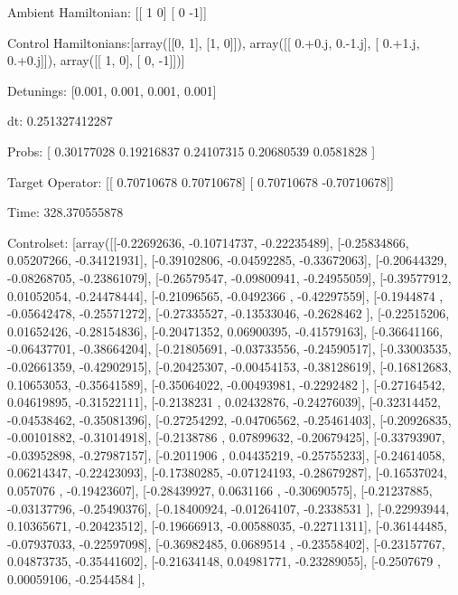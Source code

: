 \documentclass{article}
\begin{document}
    

\newpage

Ambient Hamiltonian: [[ 1  0]
 [ 0 -1]]

Control Hamiltonians:[array([[0, 1],
       [1, 0]]), array([[ 0.+0.j,  0.-1.j],
       [ 0.+1.j,  0.+0.j]]), array([[ 1,  0],
       [ 0, -1]])]

Detunings: [0.001, 0.001, 0.001, 0.001]

 dt: 0.251327412287

Probs: [ 0.30177028  0.19216837  0.24107315  0.20680539  0.0581828 ]

Target Operator: [[ 0.70710678  0.70710678]
 [ 0.70710678 -0.70710678]]

Time: 328.370555878

Controlset: [array([[-0.22692636, -0.10714737, -0.22235489],
       [-0.25834866,  0.05207266, -0.34121931],
       [-0.39102806, -0.04592285, -0.33672063],
       [-0.20644329, -0.08268705, -0.23861079],
       [-0.26579547, -0.09800941, -0.24955059],
       [-0.39577912,  0.01052054, -0.24478444],
       [-0.21096565, -0.0492366 , -0.42297559],
       [-0.1944874 , -0.05642478, -0.25571272],
       [-0.27335527, -0.13533046, -0.2628462 ],
       [-0.22515206,  0.01652426, -0.28154836],
       [-0.20471352,  0.06900395, -0.41579163],
       [-0.36641166, -0.06437701, -0.38664204],
       [-0.21805691, -0.03733556, -0.24590517],
       [-0.33003535, -0.02661359, -0.42902915],
       [-0.20425307, -0.00454153, -0.38128619],
       [-0.16812683,  0.10653053, -0.35641589],
       [-0.35064022, -0.00493981, -0.2292482 ],
       [-0.27164542,  0.04619895, -0.31522111],
       [-0.2138231 ,  0.02432876, -0.24276039],
       [-0.32314452, -0.04538462, -0.35081396],
       [-0.27254292, -0.04706562, -0.25461403],
       [-0.20926835, -0.00101882, -0.31014918],
       [-0.2138786 ,  0.07899632, -0.20679425],
       [-0.33793907, -0.03952898, -0.27987157],
       [-0.2011906 ,  0.04435219, -0.25755233],
       [-0.24614058,  0.06214347, -0.22423093],
       [-0.17380285, -0.07124193, -0.28679287],
       [-0.16537024,  0.057076  , -0.19423607],
       [-0.28439927,  0.0631166 , -0.30690575],
       [-0.21237885, -0.03137796, -0.25490376],
       [-0.18400924, -0.01264107, -0.2338531 ],
       [-0.22993944,  0.10365671, -0.20423512],
       [-0.19666913, -0.00588035, -0.22711311],
       [-0.36144485, -0.07937033, -0.22597098],
       [-0.36982485,  0.0689514 , -0.23558402],
       [-0.23157767,  0.04873735, -0.35441602],
       [-0.21634148,  0.04981771, -0.23289055],
       [-0.2507679 ,  0.00059106, -0.2544584 ],
\end{document}
